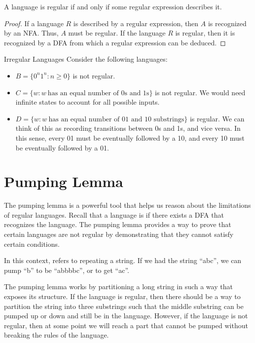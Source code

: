 \begin{thmbox}{}{}
    A language is regular if and only if some regular expression describes it.
    \tcblower
    \begin{proof}
        If a language $R$ is described by a regular expression, then $A$ is recognized by an NFA. Thus, $A$ must be regular. If the language $R$ is regular, then it is recognized by a DFA from which a regular expression can be deduced.
    \end{proof}
\end{thmbox}

\begin{exbox}{Irregular Languages}{}
    Consider the following languages:
    \begin{itemize}[noitemsep]
        \item $B = \{ 0^n 1^n : n \geq 0\}$ is not regular.
        \item $C = \{ w : w\ \text{has an equal number of 0s and 1s} \}$ is not regular. We would need infinite states to account for all possible inputs.
        \item $D = \{ w : w\ \text{has an equal number of 01 and 10 substrings} \}$ is regular. We can think of this as recording transitions between 0s and 1s, and vice versa. In this sense, every 01 must be eventually followed by a 10, and every 10 must be eventually followed by a 01.
    \end{itemize}
\end{exbox}

\section{Pumping Lemma}
The pumping lemma is a powerful tool that helps us reason about the limitations of regular languages. Recall that a language is  if there exists a DFA that recognizes the language. The pumping lemma provides a way to prove that certain languages are not regular by demonstrating that they cannot satisfy certain conditions.

\begin{notebox}
    In this context,  refers to repeating a string. If we had the string ``abc'', we can pump ``b'' to be ``abbbbc'', or  to get ``ac''.
\end{notebox}

The pumping lemma works by partitioning a long string in such a way that exposes its structure. If the language is regular, then there should be a way to partition the string into three substrings such that the middle substring can be pumped up or down and still be in the language. However, if the language is not regular, then at some point we will reach a part that cannot be pumped without breaking the rules of the language.

